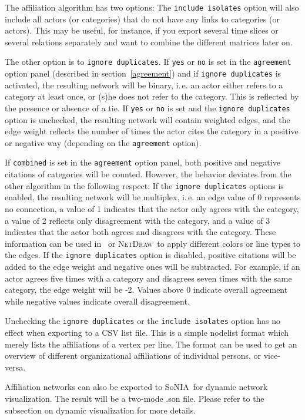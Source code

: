 \documentclass[12pt,a4paper]{scrreprt}
\newcommand{\visone}
{\textsf%
 {\protect\raisebox{.5ex}{\color[rgb]{0.1,0.1,0.1}v}%
  \protect\raisebox{.1ex}{\color[rgb]{0.3,0.3,0.3}i}%
  \protect\raisebox{-.1ex}{\color[rgb]{0.1,0.1,0.1}s}%
  \protect\raisebox{.1ex}{\color[rgb]{0.3,0.3,0.3}o}%
  \protect\raisebox{-.1ex}{\color[rgb]{0.1,0.1,0.1}n}%
  \protect\raisebox{-.4ex}{\color[rgb]{0.3,0.3,0.3}e}%
 }%
}
\newcommand{\netdraw}{\textsc{NetDraw}}
\newcommand{\sonia}{SoNIA}
\newcommand{\code}[1]{\texttt{#1}}
\begin{document}
The affiliation algorithm has two options: The \code{include isolates} option will also include all actors (or categories) that do not have any links to categories (or actors). This may be useful, for instance, if you export several time slices or several relations separately and want to combine the different matrices later on.

The other option is to \code{ignore duplicates}. If \code{yes} or \code{no} is set in the \code{agreement} option panel (described in section~\ref{agreement}) and if \code{ignore duplicates} is activated, the resulting network will be binary, i.\,e. an actor either refers to a category at least once, or (s)he does not refer to the category. This is reflected by the presence or absence of a tie. If \code{yes} or \code{no} is set and the \code{ignore duplicates} option is unchecked, the resulting network will contain weighted edges, and the edge weight reflects the number of times the actor cites the category in a positive or negative way (depending on the \code{agreement} option).

If \code{combined} is set in the \code{agreement} option panel, both positive and negative citations of categories will be counted. However, the behavior deviates from the other algorithm in the following respect: If the \code{ignore duplicates} options is enabled, the resulting network will be multiplex, i.\,e. an edge value of 0 represents no connection, a value of 1 indicates that the actor only agrees with the category, a value of 2 reflects only disagreement with the category, and a value of 3 indicates that the actor both agrees and disagrees with the category. These information can be used in \visone\ or \netdraw\ to apply different colors or line types to the edges. If the \code{ignore duplicates} option is disabled, positive citations will be added to the edge weight and negative ones will be subtracted. For example, if an actor agrees five times with a category and disagrees seven times with the same category, the edge weight will be -2. Values above 0 indicate overall agreement while negative values indicate overall disagreement.

Unchecking the \code{ignore duplicates} or the \code{include isolates} option has no effect when exporting to a CSV list file. This is a simple nodelist format which merely lists the affiliations of a vertex per line. The format can be used to get an overview of different organizational affiliations of individual persons, or vice-versa.

Affiliation networks can also be exported to \sonia\ for dynamic network visualization. The result will be a two-mode .son file. Please refer to the subsection on dynamic visualization for more details.
\end{document}
